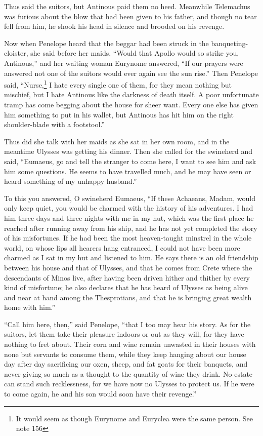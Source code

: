 Thus said the suitors, but Antinous paid them no heed. Meanwhile Telemachus was
furious about the blow that had been given to his father, and though no tear
fell from him, he shook his head in silence and brooded on his revenge.

Now when Penelope heard that the beggar had been struck in the
banqueting-cloister, she said before her maids, “Would that Apollo would so
strike you, Antinous,” and her waiting woman Eurynome answered, “If our prayers
were answered not one of the suitors would ever again see the sun rise.” Then
Penelope said, “Nurse,\footnote{It would seem as though Eurynome and Euryclea were the same person. See note
156} I hate every single one of them,
for they mean nothing but mischief, but I hate Antinous like the darkness of
death itself. A poor unfortunate tramp has come begging about the house for
sheer want. Every one else has given him something to put in his wallet, but
Antinous has hit him on the right shoulder-blade with a footstool.”

Thus did she talk with her maids as she sat in her own room, and in the
meantime Ulysses was getting his dinner. Then she called for the swineherd and
said, “Eumaeus, go and tell the stranger to come here, I want to see him and
ask him some questions. He seems to have travelled much, and he may have seen
or heard something of my unhappy husband.”

To this you answered, O swineherd Eumaeus, “If these Achaeans, Madam, would
only keep quiet, you would be charmed with the history of his adventures. I had
him three days and three nights with me in my hut, which was the first place he
reached after running away from his ship, and he has not yet completed the
story of his misfortunes. If he had been the most heaven-taught minstrel in the
whole world, on whose lips all hearers hang entranced, I could not have been
more charmed as I sat in my hut and listened to him. He says there is an old
friendship between his house and that of Ulysses, and that he comes from Crete
where the descendants of Minos live, after having been driven hither and
thither by every kind of misfortune; he also declares that he has heard of
Ulysses as being alive and near at hand among the Thesprotians, and that he is
bringing great wealth home with him.”

“Call him here, then,” said Penelope, “that I too may hear his story. As for
the suitors, let them take their pleasure indoors or out as they will, for they
have nothing to fret about. Their corn and wine remain unwasted in their houses
with none but servants to consume them, while they keep hanging about our house
day after day sacrificing our oxen, sheep, and fat goats for their banquets,
and never giving so much as a thought to the quantity of wine they drink. No
estate can stand such recklessness, for we have now no Ulysses to protect us.
If he were to come again, he and his son would soon have their revenge.”

